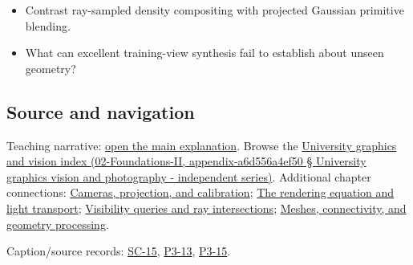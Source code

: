 \begin{itemize}
\tightlist
\item
  Contrast ray-sampled density compositing with projected Gaussian primitive blending.
\item
  What can excellent training-view synthesis fail to establish about unseen geometry?
\end{itemize}

\subsection{Source and navigation}\label{source-and-navigation}

Teaching narrative: \href{Continuous\%20Notes/University\%20-\%20Worlds,\%20Images\%20and\%20Inference\%20-\%20Graphics,\%20Vision\%20and\%20Photography\#Learned\%20representations\%20of\%203D\%20shape\%20and\%20scenes}{open the main explanation}. Browse the \href{}{University graphics and vision index (02-Foundations-II, appendix-a6d556a4ef50 § University graphics vision and photography - independent series)}. Additional chapter connections: \href{Continuous\%20Notes/University\%20-\%20Worlds,\%20Images\%20and\%20Inference\%20-\%20Graphics,\%20Vision\%20and\%20Photography\#Cameras,\%20projection,\%20and\%20calibration}{Cameras, projection, and calibration}; \href{Continuous\%20Notes/University\%20-\%20Worlds,\%20Images\%20and\%20Inference\%20-\%20Graphics,\%20Vision\%20and\%20Photography\#The\%20rendering\%20equation\%20and\%20light\%20transport}{The rendering equation and light transport}; \href{Continuous\%20Notes/University\%20-\%20Worlds,\%20Images\%20and\%20Inference\%20-\%20Graphics,\%20Vision\%20and\%20Photography\#Visibility\%20queries\%20and\%20ray\%20intersections}{Visibility queries and ray intersections}; \href{Continuous\%20Notes/University\%20-\%20Worlds,\%20Images\%20and\%20Inference\%20-\%20Graphics,\%20Vision\%20and\%20Photography\#Meshes,\%20connectivity,\%20and\%20geometry\%20processing}{Meshes, connectivity, and geometry processing}.

Caption/source records: \href{Continuous\%20Notes/University\%20-\%20Worlds,\%20Images\%20and\%20Inference\%20-\%20Graphics,\%20Vision\%20and\%20Photography\#SC-15\%20-\%20Stanford\%20CS231N\%20Deep\%20Learning\%20for\%20Computer\%20Vision\%20Spring\%202025\%20Lecture\%2015:\%203D\%20Vision}{SC-15}, \href{Continuous\%20Notes/University\%20-\%20Worlds,\%20Images\%20and\%20Inference\%20-\%20Graphics,\%20Vision\%20and\%20Photography\#P3-13\%20-\%20Curves\%20and\%20Surfaces}{P3-13}, \href{Continuous\%20Notes/University\%20-\%20Worlds,\%20Images\%20and\%20Inference\%20-\%20Graphics,\%20Vision\%20and\%20Photography\#P3-15\%20-\%20Ray\%20Tracing}{P3-15}.
